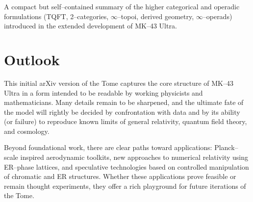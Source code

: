 \documentclass[11pt]{book}
\begin{document}
A compact but self--contained summary of the higher categorical and operadic formulations (TQFT, 2--categories, $\infty$--topoi, derived geometry, $\infty$--operads) introduced in the extended development of MK--43 Ultra.


\backmatter

\chapter*{Outlook}

This initial arXiv version of the Tome captures the core structure of MK--43 Ultra in a form intended to be readable by working physicists and mathematicians.
Many details remain to be sharpened, and the ultimate fate of the model will rightly be decided by confrontation with data and by its ability (or failure) to reproduce known limits of general relativity, quantum field theory, and cosmology.

Beyond foundational work, there are clear paths toward applications:
Planck--scale inspired aerodynamic toolkits, new approaches to numerical relativity using ER--phase lattices, and speculative technologies based on controlled manipulation of chromatic and ER structures.
Whether these applications prove feasible or remain thought experiments, they offer a rich playground for future iterations of the Tome.
\end{document}
